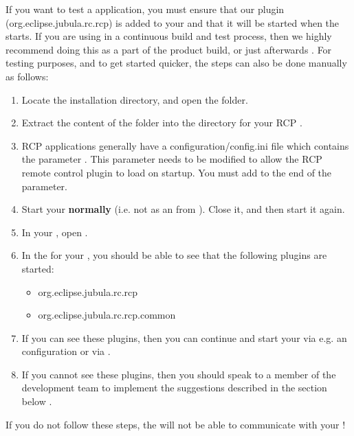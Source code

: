 
If you want to test a  application, you must ensure that our  plugin (org.eclipse.jubula.rc.rcp) is added to your \gdaut{} and that it will be started when the \gdaut{} starts. If you are using \app{} in a continuous build and test process, then we highly recommend doing this as a part of the product build, or just afterwards . For testing purposes, and to get started quicker, the steps can also be done manually as follows:


\begin{enumerate}
\item Locate the \app{} installation directory, and open the  folder.
\item Extract the content of the  folder into the  directory for your RCP \gdaut{}.
\item RCP applications generally have a configuration/config.ini file which contains the parameter . This parameter needs to be modified to allow the RCP remote control plugin to load on \gdaut{} startup. You must add   to the end of the  parameter.
\item Start your \gdaut{} \textbf{normally} (i.e. not as an \gdaut{} from \app{}). Close it, and then start it again. 
\item In your \gdaut{}, open . 
\item In the  for your \gdaut{}, you should be able to see that the following plugins are started:
\begin{itemize}
\item org.eclipse.jubula.rc.rcp
\item org.eclipse.jubula.rc.rcp.common
\end{itemize}
\item If you can see these plugins, then you can continue and start your \gdaut{} via e.g. an \gdaut{} configuration  or via  . 
\item If you cannot see these plugins, then you should speak to a member of the development team to implement the suggestions described in the section below .
\end{enumerate}
If you do not follow these steps, the \gdagent{} will not be able to communicate with your \gdaut{}!

